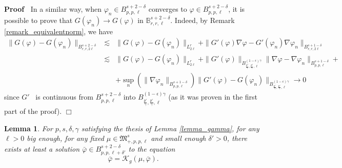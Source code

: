 \documentclass[a4paper,10pt]{article}
\newenvironment{proof}{\noindent\textbf{Proof\ }}{\hspace*{\fill}$\Box$\medskip}
\newtheorem{lemma}[theorem]{Lemma}
\begin{document}
\begin{proof}
  In a similar way, when $\varphi_n \in B^{s + 2 - \delta}_{p, p, \ell}$
  converges to $\varphi \in B^{s + 2 - \delta}_{p, p, \ell}$, it is possible
  to prove that $G (\varphi_n) \rightarrow G (\varphi)$ in $\mathbb{B}^{s + 2
  - \delta}_{r, r, \ell}$. Indeed, by Remark \ref{remark_equivalentnorm}, we
  have
  \begin{eqnarray}
    \| G (\varphi) - G (\varphi_n) \|_{B^{s + 2 - \delta}_{r, r, 2 \ell}} &
    \lesssim & \| G (\varphi) - G (\varphi_n) \|_{L^r_{2 \ell}} + \| G'
    (\varphi) \nabla \varphi - G' (\varphi_n) \nabla \varphi_n \|_{B^{s + 1 -
    \delta}_{r, r, 2 \ell}} \nonumber\\
    & \lesssim & \| G (\varphi) - G (\varphi_n) \|_{L^r_{2 \ell}} + \| G'
    (\varphi) \|_{B^{(1 - \epsilon) \gamma}_{\frac{p'}{\gamma},
    \frac{p'}{\gamma}, \ell}} \| \nabla \varphi - \nabla \varphi_n \|_{B^{s
    + 1 - \delta}_{p, p, \ell}} + \nonumber\\
    &  & + \sup_n (\| \nabla \varphi_n \|_{B^{s + 1 - \delta}_{p, p, \ell}})
    \| G' (\varphi) - G (\varphi_n) \|_{B^{(1 - \epsilon)
    \gamma}_{\frac{p'}{\gamma}, \frac{p'}{\gamma}, \ell}} \rightarrow 0
    \nonumber
  \end{eqnarray}
  since $G'$ \ is continuous from $B^{s + 2 - \delta}_{p, p, \ell}$ into
  $B^{(1 - \epsilon) \gamma}_{\frac{p'}{\gamma}, \frac{p'}{\gamma}, \ell}$
  (as it was proven in the first part of the proof).
\end{proof}

\begin{lemma}
  \label{lemma_exponentialexistence}For $p, s, \delta, \gamma$ satisfying the
  thesis of Lemma \ref{lemma_gamma}, for any $\ell > 0$ big enough, for any
  fixed $\mu \in \mathfrak{M}^s_{+, p, p, \ell}$ and small enough $\delta' >
  0$, there exists at least a solution $\bar{\varphi} \in B^{s + 2 -
  \delta}_{p, p, \ell + \delta'}$ to the equation
  \begin{equation}
    \bar{\varphi} = \mathcal{K}_g (\mu, \bar{\varphi}) . \label{eq:K1}
  \end{equation}
\end{lemma}
\end{document}
